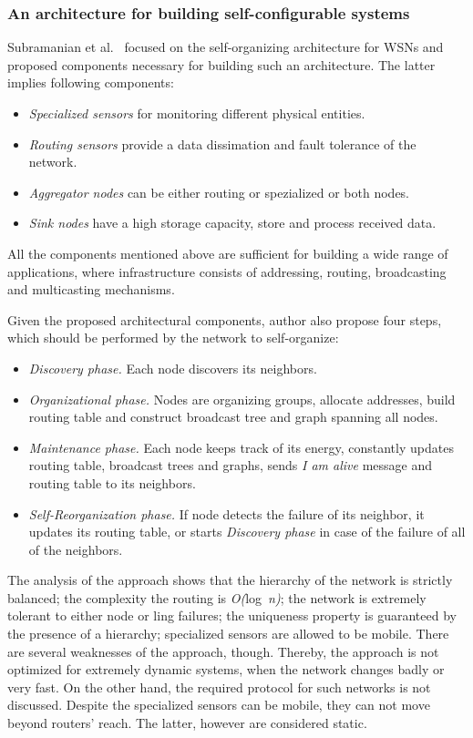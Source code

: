\subsubsection*{An architecture for building self-configurable systems}

Subramanian et al.~\cite{subramanian00} focused on the self-organizing architecture for WSNs and
proposed components necessary for building such an architecture. The latter
implies following components:

\begin{itemize}
\item \emph{Specialized sensors} for monitoring different physical entities.
\item \emph{Routing sensors} provide a data dissimation and fault tolerance of the network.
\item \emph{Aggregator nodes} can be either routing or spezialized or both nodes.
\item \emph{Sink nodes} have a high storage capacity, store and process received data.
\end{itemize}
All the components mentioned above are sufficient for building a wide range of
applications, where infrastructure consists of addressing, routing, broadcasting
and multicasting mechanisms.

Given the proposed architectural components, author also propose four steps,
which should be performed by the network to self-organize:

\begin{itemize}
\item \emph{Discovery phase.} Each node discovers its neighbors.
\item \emph{Organizational phase.} Nodes are organizing groups, allocate
addresses, build routing table and construct broadcast tree and graph spanning
all nodes.
\item \emph{Maintenance phase.} Each node keeps track of its energy, constantly
updates routing table, broadcast trees and graphs, sends \emph{I am alive}
message and routing table to its neighbors.
\item \emph{Self-Reorganization phase.} If node detects the failure of its
neighbor, it updates its routing table, or starts \emph{Discovery phase} in case
of the failure of all of the neighbors.
\end{itemize}

The analysis of the approach shows that the hierarchy of the network is strictly
balanced; the complexity the routing is \emph{O(}log~\emph{n)}; the network is
extremely tolerant to either node or ling failures; the uniqueness property is
guaranteed by the presence of a hierarchy; specialized sensors are allowed to be
mobile. There are several weaknesses of the approach, though. Thereby,
the approach is not optimized for extremely dynamic systems, when the network
changes badly or very fast. On the other hand, the required protocol for such
networks is not discussed. Despite the specialized sensors can be mobile, they
can not move beyond routers' reach. The latter, however are considered static.
